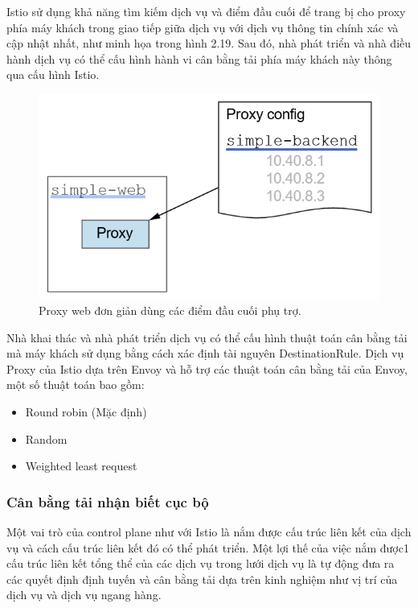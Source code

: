 \documentclass[12pt,a4paper]{report}
\begin{document}
Istio sử dụng khả năng tìm kiếm dịch vụ và điểm đầu cuối để trang bị cho proxy phía máy khách trong giao tiếp giữa dịch vụ với dịch vụ thông tin chính xác và cập nhật nhất, như minh họa trong hình 2.19. Sau đó, nhà phát triển và nhà điều hành dịch vụ có thể cấu hình hành vi cân bằng tải phía máy khách này thông qua cấu hình Istio.
\begin{figure}[h]
	\centering
	\includegraphics[width=0.7\linewidth]{Pics/2.2.3-p2}
	\caption{Proxy web đơn giản dùng các điểm đầu cuối phụ trợ.}
	\label{fig:2.2.3-2}
\end{figure}

Nhà khai thác và nhà phát triển dịch vụ có thể cấu hình thuật toán cân bằng tải mà máy khách sử dụng bằng cách xác định tài nguyên DestinationRule. Dịch vụ Proxy của Istio dựa trên Envoy và hỗ trợ các thuật toán cân bằng tải của Envoy, một số thuật toán bao gồm:
\begin{itemize}
	\item Round robin (Mặc định)
	\item Random
	\item Weighted least request
\end{itemize}
			\subsubsection{Cân bằng tải nhận biết cục bộ}
\hspace{0.6cm}Một vai trò của control plane như với Istio là nắm được cấu trúc liên kết của dịch vụ và cách cấu trúc liên kết đó có thể phát triển. Một lợi thế của việc nắm được1 cấu trúc liên kết tổng thể của các dịch vụ trong lưới dịch vụ là tự động đưa ra các quyết định định tuyến và cân bằng tải dựa trên kinh nghiệm như vị trí của dịch vụ và dịch vụ ngang hàng.
\end{document}
